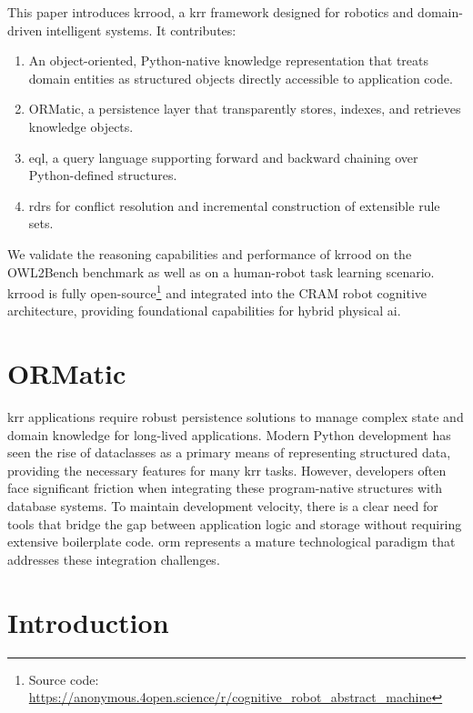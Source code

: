 \documentclass{article}
\begin{document}
This paper introduces \ac{krrood}, a \ac{krr} framework designed for robotics and domain-driven intelligent systems. It contributes:

\begin{enumerate}
\item An object-oriented, Python-native knowledge representation that treats domain entities as structured objects directly accessible to application code.

\item ORMatic, a persistence layer that transparently stores, indexes, and retrieves knowledge objects.

\item \ac{eql}, a query language supporting forward and backward chaining over Python-defined structures.

\item \acp{rdr} for conflict resolution and incremental construction of extensible rule sets.
\end{enumerate}

We validate the reasoning capabilities and performance of \ac{krrood} on the OWL2Bench benchmark as well as on a human-robot task learning scenario. \ac{krrood} is fully open-source\footnote{Source code: \url{https://anonymous.4open.science/r/cognitive_robot_abstract_machine}} and integrated into the CRAM robot cognitive architecture, providing foundational capabilities for hybrid physical \ac{ai}.


\section{ORMatic}
\label{sec:ormatic}

\ac{krr} applications require robust persistence solutions to manage complex state and domain knowledge for long-lived applications. Modern Python development has seen the rise of dataclasses as a primary means of representing structured data, providing the necessary features for many \ac{krr} tasks. However, developers often face significant friction when integrating these program-native structures with database systems. To maintain development velocity, there is a clear need for tools that bridge the gap between application logic and storage without requiring extensive boilerplate code. \Acf{orm} represents a mature technological paradigm that addresses these integration challenges.


\section{Introduction}
\label{sec:introduction}
\end{document}
